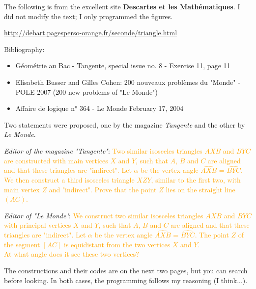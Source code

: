 The following is from the excellent site \textbf{Descartes et les Mathématiques}. I did not modify the text; I only programmed the figures.

\url{http://debart.pagesperso-orange.fr/seconde/triangle.html}

Bibliography:

\begin{itemize}
\item   Géométrie au Bac - Tangente, special issue no. 8 - Exercise 11, page 11

\item   Elisabeth Busser and Gilles Cohen: 200 nouveaux problèmes du "Monde" - POLE 2007 (200 new problems of "Le Monde")

\item   Affaire de logique n° 364 - Le Monde February 17, 2004
\end{itemize}


Two statements were proposed, one by the magazine \textit{Tangente} and the other by \textit{Le Monde}.

\vspace*{2cm}
\emph{Editor of the magazine "Tangente"}: \textcolor{orange}{Two similar isosceles triangles $AXB$ and $BYC$ are constructed with main vertices $X$ and $Y$, such that $A$, $B$ and $C$ are aligned and that these triangles are "indirect". Let $\alpha$ be the vertex angle $\widehat{AXB}$ = $\widehat{BYC}$. We then construct a third isosceles triangle $XZY$, similar to the first two, with main vertex $Z$ and "indirect".
Prove that the point $Z$ lies on the straight line $(AC)$.}

\vspace*{2cm}
\emph{Editor of  "Le Monde"}: \textcolor{orange}{We construct two similar isosceles triangles $AXB$ and $BYC$ with principal vertices $X$ and $Y$, such that $A$, $B$ and $C$ are aligned and that these triangles are "indirect". Let $\alpha$ be the vertex angle $\widehat{AXB}$ = $\widehat{BYC}$. The point $Z$ of the segment $[AC]$ is equidistant from the two vertices $X$ and $Y$.\\
At what angle does it see these two vertices?}

\vspace*{2cm} The constructions and their codes are on the next two pages, but you can search before looking. In both cases, the programming follows my reasoning (I think...).

